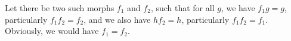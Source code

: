 \quad
\begin{center}\end{center}
  Let there be two such morphs $f_1$ and $f_2$, such that for all $g$, we have $f_1 g = g$, particularly $f_1 f_2 = f_2$, and we also have $h f_2 = h$, particularly $f_1 f_2 = f_1$. Obviously, we would have $f_1 = f_2$.
